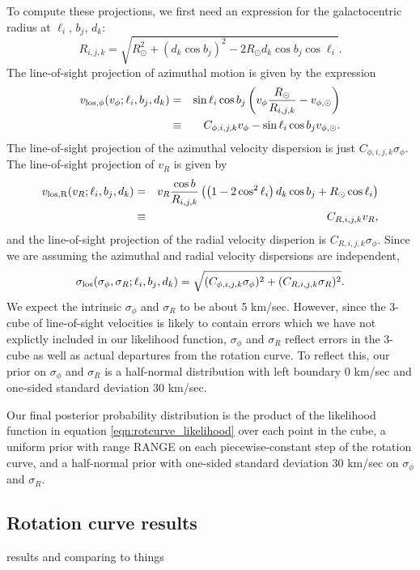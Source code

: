 To compute these projections, we first need an expression for the galactocentric radius at $\ell_i$, $b_j$, $d_k$:
\begin{equation}
\label{eqn:radius}
    R_{i,j,k} = \sqrt{ R_\odot^2 + (d_k \cos b_j)^2 - 2 R_\odot d_k \cos b_j \cos \ell_i}.
\end{equation}
The line-of-sight projection of azimuthal motion is given by the expression
\begin{eqnarray}
\label{eqn:velo-los-phi}
    v_{\rm{los}, \phi}(v_\phi; \ell_i, b_j, d_k) &=& \sin \ell_i \cos b_j  \left( v_\phi \frac{R_\odot}{R_{i,j,k}} - v_{\phi, \odot} \right)\\
    &\equiv& C_{\phi,i,j,k} v_\phi - \sin \ell_i \cos b_j v_{\phi, \odot}.
\end{eqnarray}
The line-of-sight projection of the azimuthal velocity dispersion is just $C_{\phi,i,j,k} \sigma_\phi$. The line-of-sight projection of $v_R$ is given  by 
\begin{eqnarray}
\label{eqn:velo-los-radial}
    v_{\rm{los}, R} (v_R; \ell_i,  b_j, d_k) &=& v_R \frac{\cos b}{R_{i,j,k}} \left( \left( 1 - 2 \cos^2 \ell_i \right) d_k \cos b_j + R_\odot \cos \ell_i \right)\\
    &\equiv& C_{R,i,j,k} v_R,
\end{eqnarray}
and the line-of-sight projection of the radial velocity disperion is $C_{R,i,j,k} \sigma_\phi$. Since we are assuming the azimuthal and radial velocity dispersions are independent,
\begin{equation}
\label{eqn:velo-los-dispersion}
    \sigma_{\rm{los}} (\sigma_\phi, \sigma_R; \ell_i, b_j, d_k) = \sqrt{ (C_{\phi,i,j,k} \sigma_\phi)^2 + (C_{R,i,j,k} \sigma_R)^2 }.
\end{equation}
We expect the intrinsic $\sigma_\phi$ and $\sigma_R$ to be about 5 km/sec. However, since the 3-cube of line-of-sight velocities is likely to contain errors which we have not explictly included in our likelihood function, $\sigma_\phi$ and $\sigma_R$ reflect errors in the 3-cube as well as actual departures from the rotation curve. To reflect this, our prior on $\sigma_\phi$ and $\sigma_R$ is a half-normal distribution with left boundary 0 km/sec and one-sided standard deviation 30 km/sec. 

Our final posterior probability distribution is the product of the likelihood function in equation \ref{eqn:rotcurve_likelihood} over each point in the cube, a uniform prior with range RANGE on each piecewise-constant step of the rotation curve, and a half-normal prior with one-sided standard deviation 30 km/sec on $\sigma_\phi$ and $\sigma_R$. 

\subsection{Rotation curve results}
results and comparing to things